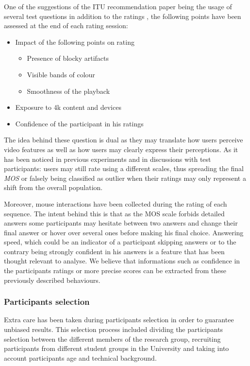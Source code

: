 One of the suggestions of the ITU recommendation paper being the usage of several test questions in addition to the ratings \cite{rec1998p}, the following points have been assessed at the end of each rating session:
\begin{itemize}
	\item Impact of the following points on rating 
	\begin{itemize}
		\item Presence of blocky artifacts
		\item Visible bands of colour
		\item Smoothness of the playback
	\end{itemize}
	\item Exposure to 4k content and devices
	\item Confidence of the participant in his ratings
\end{itemize}

The idea behind these question is dual as they may translate how users perceive video features as well as how users may clearly express their perceptions. As it has been noticed in previous experiments and in discussions with test participants: users may still rate using a different scales, thus spreading the final \textit{MOS} or falsely being classified as outlier when their ratings may only represent a shift from the overall population. 

Moreover, mouse interactions have been collected during the rating of each sequence. The intent behind this is that as the MOS scale forbids detailed answers some participants may hesitate between two answers and change their final answer or hover over several ones before making his final choice.
Answering speed, which could be an indicator of a participant skipping answers or to the contrary being strongly confident in his answers is a feature that has been thought relevant to analyse. 
We believe that informations such as confidence in the participants ratings or more precise scores can be extracted from these previously described behaviours.


\subsubsection{Participants selection}
Extra care has been taken during participants selection in order to guarantee unbiased results. This selection process included dividing the participants selection between the different members of the research  group, recruiting participants from different student groups in the University and taking into account participants age and technical background.
